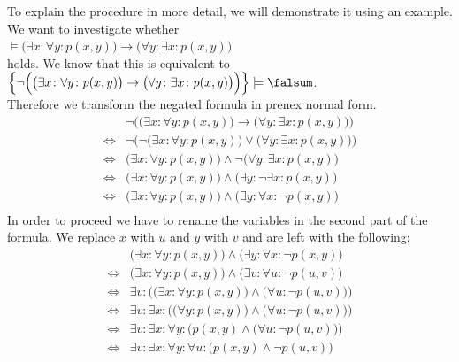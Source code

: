 To explain the procedure in more detail, we will demonstrate it using an example. 
We want to investigate whether 
\\[0.2cm]
\hspace*{1.3cm} 
$\models \big(\exists x\colon \forall y\colon  p(x,y)\big) \rightarrow \big(\forall y\colon \exists x\colon p(x,y)\big)$ \\[0.2cm]
holds. We know that this is equivalent to  \\[0.2cm]
\hspace*{1.3cm} 
$\Big\{ \neg \Big(\big(\exists x\colon \forall y\colon  p(x,y)\big) \rightarrow  \big(\forall y\colon \exists
x\colon p(x,y)\big)\Big)\Big\} \models \falsum$.
\\[0.2cm]
Therefore we transform the negated formula in prenex normal form.
$$
\begin{array}{ll}
                  & \neg \Big(\big(\exists x\colon \forall y\colon  p(x,y)\big) \rightarrow \big(\forall y\colon \exists x\colon p(x,y)\big)\Big) \\
  \Leftrightarrow & \neg \Big(\neg \big(\exists x\colon \forall y\colon  p(x,y)\big) \vee \big(\forall y\colon \exists x\colon p(x,y)\big)\Big) \\
  \Leftrightarrow &                \big(\exists x\colon \forall y\colon  p(x,y)\big) \wedge \neg \big(\forall y\colon \exists x\colon p(x,y)\big) \\
  \Leftrightarrow &\big(\exists x\colon \forall y\colon  p(x,y)\big) \wedge  \big(\exists y\colon  \neg \exists x\colon p(x,y)\big) \\
  \Leftrightarrow &\big(\exists x\colon \forall y\colon  p(x,y)\big) \wedge  \big(\exists y\colon  \forall x\colon \neg p(x,y)\big) \\
\end{array}
$$
In order to proceed we have to rename the variables in the second part of the formula.
We replace $x$ with $u$ and $y$ with $v$ and are left with the following:
$$
\begin{array}{ll}
                  &\big(\exists x\colon \forall y\colon  p(x,y)\big) \wedge  \big(\exists y\colon  \forall x\colon \neg p(x,y)\big) \\
  \Leftrightarrow &\big(\exists x\colon \forall y\colon  p(x,y)\big) \wedge  \big(\exists v\colon  \forall u\colon \neg p(u,v)\big) \\
  \Leftrightarrow &\exists v\colon  \Big( \big(\exists x\colon \forall y\colon  p(x,y)\big) \wedge  \big(\forall u\colon \neg p(u,v)\big) \Big)\\
  \Leftrightarrow &\exists v\colon  \exists x\colon  \Big( \big(\forall y\colon  p(x,y)\big) \wedge \big(\forall u\colon \neg p(u,v)\big) \Big)\\
  \Leftrightarrow &\exists v\colon  \exists x\colon \forall y\colon \Big( p(x,y) \wedge \big(\forall u\colon \neg p(u,v)\big) \Big)\\
  \Leftrightarrow &\exists v\colon  \exists x\colon \forall y\colon \forall u\colon \Big( p(x,y) \wedge \neg p(u,v) \Big)\\
\end{array}
$$
